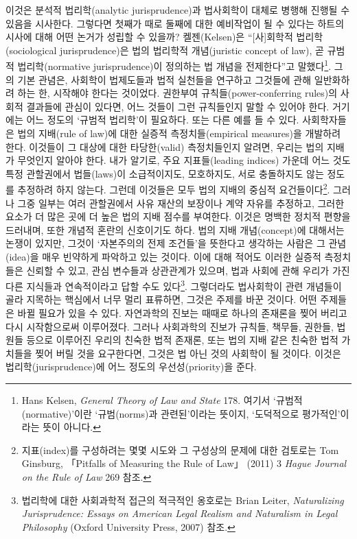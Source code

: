 이것은 분석적 법리학(analytic jurisprudence)과 법사회학이 대체로 병행해
진행될 수 있음을 시사한다. 그렇다면 첫째가 때로 둘째에 대한 예비작업이
될 수 있다는 하트의 시사에 대해 어떤 논거가 성립할 수 있을까?
켈젠(Kelsen)은 “{[}사{]}회학적 법리학(sociological jurisprudence)은
법의 법리학적 개념(juristic concept of law), 곧 규범적 법리학(normative
jurisprudence)이 정의하는 법 개념을 전제한다”고 말했다\footnote{Hans
  Kelsen, \emph{General Theory of Law and State} 178. 여기서
  ‘규범적(normative)’이란 ‘규범(norms)과 관련된’이라는 뜻이지,
  ‘도덕적으로 평가적인’이라는 뜻이 아니다.}. 그의 기본 관념은, 사회학이
법제도들과 법적 실천들을 연구하고 그것들에 관해 일반화하려 하는 한,
 시작해야 한다는 것이었다. 권한부여
규칙들(power-conferring rules)의 사회적 결과들에 관심이 있다면, 어느
것들이 그런 규칙들인지 말할 수 있어야 한다. 거기에는 어느 정도의 ‘규범적
법리학’이 필요하다. 또는 다른 예를 들 수 있다. 사회학자들은 법의
지배(rule of law)에 대한 실증적 측정치들(empirical measures)을 개발하려
한다. 이것들이 그 대상에 대한 타당한(valid) 측정치들인지 알려면, 우리는
법의 지배가 무엇인지 알아야 한다. 내가 알기로, 주요 지표들(leading
indices) 가운데 어느 것도 특정 관할권에서 법들(laws)이 소급적이지도,
모호하지도, 서로 충돌하지도 않는 정도를 추정하려 하지 않는다. 그런데
이것들은 모두 법의 지배의 중심적 요건들이다\footnote{지표(index)를
  구성하려는 몇몇 시도와 그 구성상의 문제에 대한 검토로는 Tom Ginsburg,
  「Pitfalls of Measuring the Rule of Law」 (2011) 3 \emph{Hague Journal
  on the Rule of Law} 269 참조.}. 그러나 그중 일부는 여러 관할권에서
사유 재산의 보장이나 계약 자유를 추정하고, 그러한 요소가 더 많은 곳에 더
높은 법의 지배 점수를 부여한다. 이것은 명백한 정치적 편향을 드러내며,
또한 개념적 혼란의 신호이기도 하다. 법의 지배 개념(concept)에 대해서는
논쟁이 있지만, 그것이 ‘자본주의의 전제 조건들’을 뜻한다고 생각하는
사람은 그 관념(idea)을 매우 빈약하게 파악하고 있는 것이다. 이에 대해
적어도 이러한 실증적 측정치들은 신뢰할 수 있고, 관심 변수들과 상관관계가
있으며, 법과 사회에 관해 우리가 가진 다른 지식들과 연속적이라고 답할
수도 있다\footnote{법리학에 대한 사회과학적 접근의 적극적인 옹호로는
  Brian Leiter, \emph{Naturalizing Jurisprudence: Essays on American
  Legal Realism and Naturalism in Legal Philosophy} (Oxford University
  Press, 2007) 참조.}. 그렇더라도 법사회학이 관련 개념들이 골라 지목하는
핵심에서 너무 멀리 표류하면, 그것은 주제를 바꾼 것이다. 어떤 주제들은
바뀔 필요가 있을 수 있다. 자연과학의 진보는 때때로 하나의 존재론을 찢어
버리고 다시 시작함으로써 이루어졌다. 그러나 사회과학의 진보가 규칙들,
책무들, 권한들, 법원들 등으로 이루어진 우리의 친숙한 법적 존재론, 또는
법의 지배 같은 친숙한 법적 가치들을 찢어 버릴 것을 요구한다면, 그것은 법
아닌 것의 사회학이 될 것이다. 이것은 법리학(jurisprudence)에 어느 정도의
우선성(priority)을 준다.

